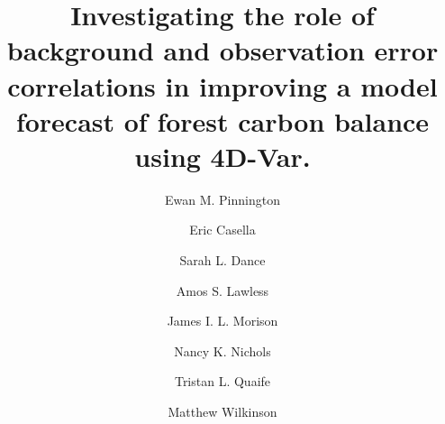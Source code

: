 \documentclass[review]{elsarticle}
\begin{document}
\begin{frontmatter}

\title{Investigating the role of background and observation error correlations in improving a model forecast of forest carbon balance using 4D-Var.}


\author[address1]{Ewan M. Pinnington}

\author[address2]{Eric Casella}

\author[address3]{Sarah L. Dance}

\author[address3]{Amos S. Lawless}

\author[address2]{James I. L. Morison}

\author[address3]{Nancy K. Nichols}

\author[address1]{Tristan L. Quaife}

\author[address2]{Matthew Wilkinson}

\address[address1]{Department of Meteorology, University of Reading, Reading, UK}
\address[address2]{Forest Research, Alice Holt, Farnham, UK}
\address[address3]{Department of Maths and Statistics and Department of Meteorology, University of Reading, Reading, UK}


\end{frontmatter}
\end{document}
